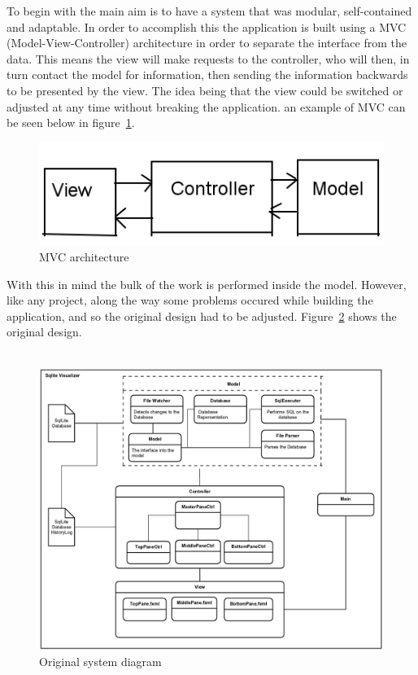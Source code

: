 To begin with the main aim is to have a system that was modular, self-contained and adaptable. In order to accomplish this the application is built using a MVC (Model-View-Controller) architecture in order to separate the interface from the data. This means the view will make requests to the controller, who will then, in turn contact the model for information, then sending the information backwards to be presented by the view. The idea being that the view could be switched or adjusted at any time without breaking the application. an example of MVC can be seen below in figure~\ref{fig:mvc}.

\begin{figure}[H]
	\centering
	\includegraphics[scale=0.5]{images/mvc.png}
	\caption{MVC architecture}
	\label{fig:mvc}
\end{figure}

With this in mind the bulk of the work is performed inside the model. However, like any project, along the way some problems occured while building the application, and so the original design had to be adjusted. Figure~\ref{fig:design_old} shows the original design.
\\\\
\begin{figure}[H]
	\centering
	\includegraphics[scale=0.2]{images/system_diagram_old.png}
	\caption{Original system diagram}
	\label{fig:design_old}
\end{figure}

